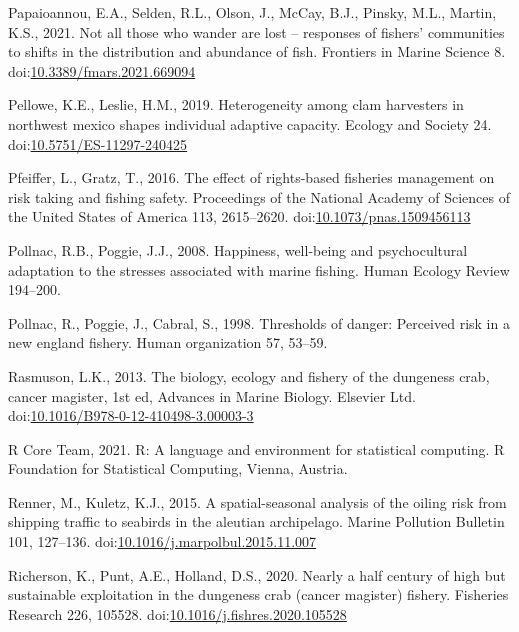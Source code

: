 \documentclass[]{elsarticle} %
\begin{document}
\leavevmode\hypertarget{ref-Papaioannou2021}{}%
Papaioannou, E.A., Selden, R.L., Olson, J., McCay, B.J., Pinsky, M.L.,
Martin, K.S., 2021. Not all those who wander are lost -- responses of
fishers' communities to shifts in the distribution and abundance of
fish. Frontiers in Marine Science 8.
doi:\href{https://doi.org/10.3389/fmars.2021.669094}{10.3389/fmars.2021.669094}

\leavevmode\hypertarget{ref-Pellowe2019}{}%
Pellowe, K.E., Leslie, H.M., 2019. Heterogeneity among clam harvesters
in northwest mexico shapes individual adaptive capacity. Ecology and
Society 24.
doi:\href{https://doi.org/10.5751/ES-11297-240425}{10.5751/ES-11297-240425}

\leavevmode\hypertarget{ref-Pfeiffer2016}{}%
Pfeiffer, L., Gratz, T., 2016. The effect of rights-based fisheries
management on risk taking and fishing safety. Proceedings of the
National Academy of Sciences of the United States of America 113,
2615--2620.
doi:\href{https://doi.org/10.1073/pnas.1509456113}{10.1073/pnas.1509456113}

\leavevmode\hypertarget{ref-Pollnac2008}{}%
Pollnac, R.B., Poggie, J.J., 2008. Happiness, well-being and
psychocultural adaptation to the stresses associated with marine
fishing. Human Ecology Review 194--200.

\leavevmode\hypertarget{ref-Pollnac1998}{}%
Pollnac, R., Poggie, J., Cabral, S., 1998. Thresholds of danger:
Perceived risk in a new england fishery. Human organization 57, 53--59.

\leavevmode\hypertarget{ref-Rasmuson2013}{}%
Rasmuson, L.K., 2013. The biology, ecology and fishery of the dungeness
crab, cancer magister, 1st ed, Advances in Marine Biology. Elsevier Ltd.
doi:\href{https://doi.org/10.1016/B978-0-12-410498-3.00003-3}{10.1016/B978-0-12-410498-3.00003-3}

\leavevmode\hypertarget{ref-RCoreTeam2021}{}%
R Core Team, 2021. R: A language and environment for statistical
computing. R Foundation for Statistical Computing, Vienna, Austria.

\leavevmode\hypertarget{ref-Renner2015}{}%
Renner, M., Kuletz, K.J., 2015. A spatial-seasonal analysis of the
oiling risk from shipping traffic to seabirds in the aleutian
archipelago. Marine Pollution Bulletin 101, 127--136.
doi:\href{https://doi.org/10.1016/j.marpolbul.2015.11.007}{10.1016/j.marpolbul.2015.11.007}

\leavevmode\hypertarget{ref-Richerson2020}{}%
Richerson, K., Punt, A.E., Holland, D.S., 2020. Nearly a half century of
high but sustainable exploitation in the dungeness crab (cancer
magister) fishery. Fisheries Research 226, 105528.
doi:\href{https://doi.org/10.1016/j.fishres.2020.105528}{10.1016/j.fishres.2020.105528}
\end{document}
